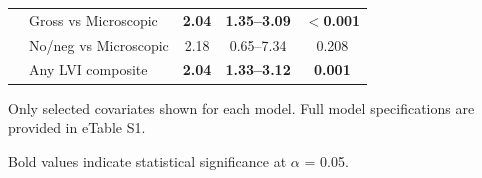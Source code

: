 \begin{table}[htbp]
\begin{tabular}{@{}llccc@{}}
 & Gross vs Microscopic & \textbf{2.04} & \textbf{1.35--3.09} & \textbf{$<$0.001} \\
 & No/neg vs Microscopic & 2.18 & 0.65--7.34 & 0.208 \\
 & Any LVI composite & \textbf{2.04} & \textbf{1.33--3.12} & \textbf{0.001} \\
\bottomrule
\end{tabular}
\begin{tablenotes}
\small
\item Only selected covariates shown for each model. Full model specifications are provided in eTable S1.
\item Bold values indicate statistical significance at $\alpha$ = 0.05.
\end{tablenotes}
\end{table}
